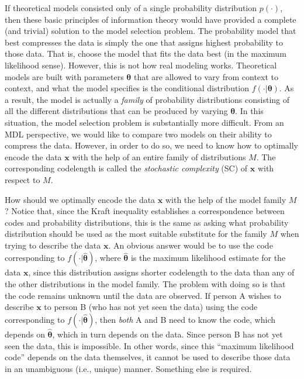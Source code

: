 \documentclass{elsart}
\begin{document}
If theoretical models consisted only of a single probability distribution $p(\cdot)$, then these
basic principles of information theory would have provided a complete (and trivial) solution to
the model selection problem. The probability model that best compresses the data is simply the one
that assigns highest probability to those data. That is, choose the model that fits the data best
(in the maximum likelihood sense). However, this is not how real modeling works. Theoretical
models are built with parameters $\bm\theta$ that are allowed to vary from context to context, and
what the model specifies is the conditional distribution $f(\cdot | \bm\theta)$. As a result, the
model is actually a \emph{family} of probability distributions consisting of all the different
distributions that can be produced by varying $\bm\theta$. In this situation, the model selection
problem is substantially more difficult. From an MDL perspective, we would like to compare two
models on their ability to compress the data. However, in order to do so, we need to know how to
optimally encode the data $\bm x$ with the help of an entire family of distributions $M$. The
corresponding codelength is called the \emph{stochastic complexity} (SC) of $\bm x$ with respect
to $M$.

How should we optimally encode the data $\bm x$ with the help of the model family $M$? Notice
that, since the Kraft inequality establishes a correspondence between codes and probability
distributions, this is the same as asking what probability distribution should be used as the most
suitable substitute for the family $M$ when trying to describe the data $\bm x$. An obvious answer
would be to use the code corresponding to $f(\cdot | \hat{\bm \theta})$, where $\hat{\bm \theta}$
is the maximum likelihood estimate for the data $\bm x$, since this distribution assigns shorter
codelength to the data than any of the other distributions in the model family. The problem with
doing so is that the code remains unknown until the data are observed. If person A wishes to
describe $\bm x$ to person B (who has not yet seen the data) using the code corresponding to
$f(\cdot | \hat{\bm \theta})$, then \emph{both} A and B need to know the code, which depends on
$\hat{\bm \theta}$, which in turn depends on the data. Since person B has not yet seen the data,
this is impossible. In other words, since this ``maximum likelihood code'' depends on the data
themselves, it cannot be used to describe those data in an unambiguous (i.e., unique) manner.
Something else is required.
\end{document}
